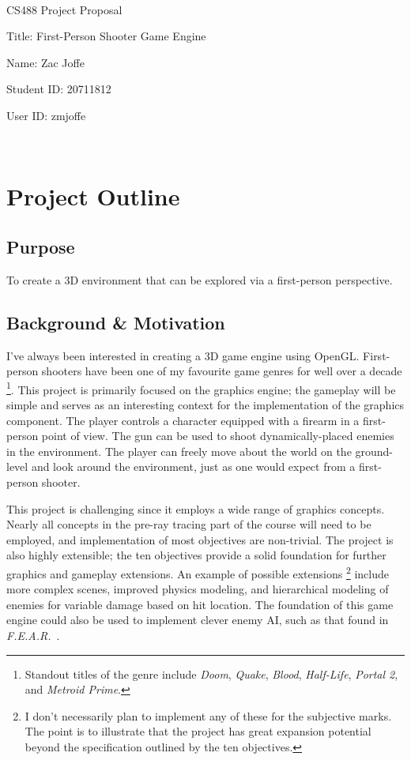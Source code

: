 \documentclass {article}
\begin{document}
~\vfill
\begin{center}
\Large

CS488 Project Proposal

Title: First-Person Shooter Game Engine

Name: Zac Joffe

Student ID: 20711812

User ID: zmjoffe

\end{center}
\vfill ~\vfill~
\newpage
\tableofcontents
\newpage

\section{Project Outline}
\subsection{Purpose}
To create a 3D environment that can be explored via a first-person perspective.


\subsection{Background \& Motivation}
I've always been interested in creating a 3D game engine using OpenGL. First-person shooters have been one of my favourite game genres for well over a decade \footnote{Standout titles of the genre include \textit{Doom}, \textit{Quake}, \textit{Blood}, \textit{Half-Life}, \textit{Portal 2}, and \textit{Metroid Prime}.}. This project is primarily focused on the graphics engine; the gameplay will be simple and serves as an interesting context for the implementation of the graphics component. The player controls a character equipped with a firearm in a first-person point of view. The gun can be used to shoot dynamically-placed enemies in the environment. The player can freely move about the world on the ground-level and look around the environment, just as one would expect from a first-person shooter.

This project is challenging since it employs a wide range of graphics concepts. Nearly all concepts in the pre-ray tracing part of the course will need to be employed, and implementation of most objectives are non-trivial. The project is also highly extensible; the ten objectives provide a solid foundation for further graphics and gameplay extensions. An example of possible extensions \footnote{I don't necessarily plan to implement any of these for the subjective marks. The point is to illustrate that the project has great expansion potential beyond the specification outlined by the ten objectives.} include more complex scenes, improved physics modeling, and hierarchical modeling of enemies for variable damage based on hit location. The foundation of this game engine could also be used to implement clever enemy AI, such as that found in \textit{F.E.A.R.}~\cite{fear}.
\end{document}
